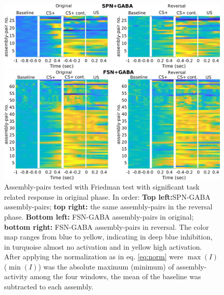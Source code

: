  \begin{figure}
     \centering
     \includegraphics[scale=0.3]{figures/HeatSPN_GABA.pdf}
     
     \vspace{1cm}
     
     \includegraphics[scale=0.3]{figures/HeatFSN_GABA.pdf}
     \caption{Assembly-pairs tested with Friedman test with significant task related response in original phase. In order: \textbf{Top left:}SPN-GABA assembly-pairs; \textbf{top right:} the same assembly-pairs in the reversal phase. \textbf{Bottom left:} FSN-GABA assembly-pairs in original; \textbf{bottom right:} FSN-GABA assembly-pairs in reversal. The color map ranges from blue to yellow, indicating in deep blue inhibition, in turquoise almost no activation and in yellow high activation. After applying the normalization as in eq. \ref{eq:norm} were $\max(I)$ ($\min(I)$) was the absolute maximum (minimum) of assembly-activity among the four windows, the mean of the baseline was subtracted to each assembly.}
     \label{fig:HeatPairsGaba}
 \end{figure}
